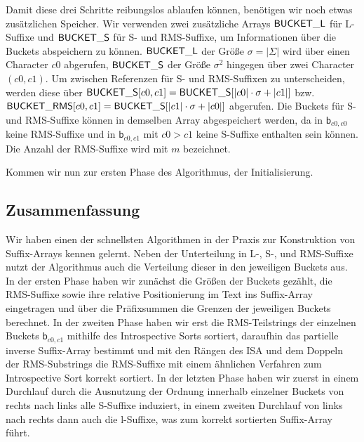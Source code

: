 Damit diese drei Schritte reibungslos ablaufen können, benötigen wir noch etwas zusätzlichen Speicher. Wir verwenden zwei zusätzliche Arrays $\mathsf{BUCK\-ET\_L}$ für L-Suffixe und $\mathsf{BUCK\-ET\_S}$ für S- und RMS-Suffixe, um Informationen über die Buckets abspeichern zu können. $\mathsf{BUCK\-ET\_L}$ der Größe $\sigma = |\Sigma |$ wird über einen Character $c0$ abgerufen, $\mathsf{BUCK\-ET\_S}$ der Größe $\sigma ^2$ hingegen über zwei Character $(c0,c1)$. Um zwischen Referenzen für S- und RMS-Suffixen zu unterscheiden, werden diese über $\mathsf{BUCK\-ET\_S}[c0,c1] = \mathsf{BUCK\-ET\_S}[|c0| \cdot \sigma + |c1|]$ bzw. $\mathsf{BUCK\-ET\_RMS}[c0,c1] = \mathsf{BUCK\-ET\_S}[|c1| \cdot \sigma + |c0|]$ abgerufen. Die Buckets für S- und RMS-Suffixe können in demselben Array abgespeichert werden, da in $\mathsf{b}_{c0,c0}$ keine RMS-Suffixe und in $\mathsf{b}_{c0,c1}$ mit $c0 > c1$ keine S-Suffixe enthalten sein können. Die Anzahl der RMS-Suffixe wird mit $m$ bezeichnet.

Kommen wir nun zur ersten Phase des Algorithmus, der Initialisierung.





\subsection{Zusammenfassung}
Wir haben einen der schnellsten Algorithmen in der Praxis zur Konstruktion von Suffix-Arrays kennen gelernt. Neben der Unterteilung in L-, S-, und RMS-Suffixe nutzt der Algorithmus auch die Verteilung dieser in den jeweiligen Buckets aus. In der ersten Phase haben wir zunächst die Größen der Buckets gezählt, die RMS-Suffixe sowie ihre relative Positionierung im Text ins Suffix-Array eingetragen und über die Präfixsummen die Grenzen der jeweiligen Buckets berechnet. In der zweiten Phase haben wir erst die RMS-Teilstrings der einzelnen Buckets $\mathsf{b}_{c0,c1}$ mithilfe des Introspective Sorts sortiert, daraufhin das partielle inverse Suffix-Array bestimmt und mit den Rängen des ISA und dem Doppeln der RMS-Substrings die RMS-Suffixe mit einem ähnlichen Verfahren zum Introspective Sort korrekt sortiert. In der letzten Phase haben wir zuerst in einem Durchlauf durch die Ausnutzung der Ordnung innerhalb einzelner Buckets von rechts nach links alle S-Suffixe induziert, in einem zweiten Durchlauf von links nach rechts dann auch die l-Suffixe, was zum korrekt sortierten Suffix-Array führt. 


